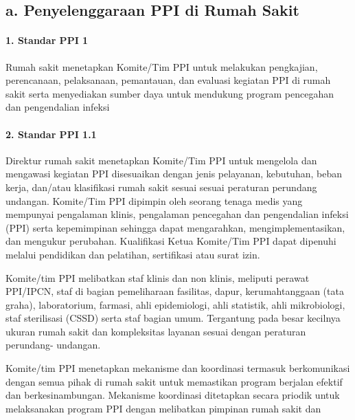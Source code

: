 \documentclass[
]{book}
\begin{document}
\hypertarget{a.-penyelenggaraan-ppi-di-rumah-sakit}{%
\subsection*{a. Penyelenggaraan PPI di Rumah Sakit}\label{a.-penyelenggaraan-ppi-di-rumah-sakit}}

\hypertarget{standar-ppi-1}{%
\paragraph*{1. Standar PPI 1}\label{standar-ppi-1}}

Rumah sakit menetapkan Komite/Tim PPI untuk melakukan pengkajian, perencanaan, pelaksanaan, pemantauan, dan evaluasi kegiatan PPI di rumah sakit serta menyediakan sumber daya untuk mendukung program pencegahan dan pengendalian infeksi

\hypertarget{standar-ppi-1.1}{%
\paragraph*{2. Standar PPI 1.1}\label{standar-ppi-1.1}}

Direktur rumah sakit menetapkan Komite/Tim PPI untuk mengelola dan mengawasi kegiatan PPI disesuaikan dengan jenis pelayanan, kebutuhan, beban kerja, dan/atau klasifikasi rumah sakit sesuai sesuai peraturan perundang undangan. Komite/Tim PPI dipimpin oleh seorang tenaga medis yang mempunyai pengalaman klinis, pengalaman pencegahan dan pengendalian infeksi (PPI) serta kepemimpinan sehingga dapat mengarahkan, mengimplementasikan, dan mengukur perubahan. Kualifikasi Ketua Komite/Tim PPI dapat dipenuhi melalui pendidikan dan pelatihan, sertifikasi atau surat izin.

Komite/tim PPI melibatkan staf klinis dan non klinis, meliputi perawat PPI/IPCN, staf di bagian pemeliharaan fasilitas, dapur, kerumahtanggaan (tata graha), laboratorium, farmasi, ahli epidemiologi, ahli statistik, ahli mikrobiologi, staf sterilisasi (CSSD) serta staf bagian umum. Tergantung pada besar kecilnya ukuran rumah sakit dan kompleksitas layanan sesuai dengan peraturan perundang- undangan.

Komite/tim PPI menetapkan mekanisme dan koordinasi termasuk berkomunikasi dengan semua pihak di rumah sakit untuk memastikan program berjalan efektif dan berkesinambungan.
Mekanisme koordinasi ditetapkan secara priodik untuk melaksanakan program PPI dengan melibatkan pimpinan rumah sakit dan
\end{document}

